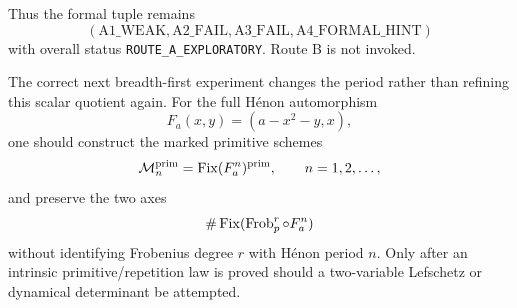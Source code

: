 Thus the formal tuple remains
\[
 \boxed{(\mathrm{A1\_WEAK},\mathrm{A2\_FAIL},
 \mathrm{A3\_FAIL},\mathrm{A4\_FORMAL\_HINT})}
\]
with overall status \texttt{ROUTE\_A\_EXPLORATORY}.  Route B is not invoked.

The correct next breadth-first experiment changes the period rather than
refining this scalar quotient again.  For the full H\'enon automorphism
\[
 F_a(x,y)=(a-x^2-y,x),
\]
one should construct the marked primitive schemes
\[
 \mathcal M_n^{\rm prim}=\operatorname{Fix}(F_a^n)^{\rm prim},
 \qquad n=1,2,\ldots,
\]
and preserve the two axes
\[
 \#\operatorname{Fix}(\operatorname{Frob}_p^r\circ F_a^n)
\]
without identifying Frobenius degree $r$ with H\'enon period $n$.  Only after
an intrinsic primitive/repetition law is proved should a two-variable
Lefschetz or dynamical determinant be attempted.
